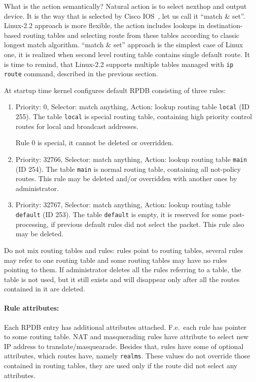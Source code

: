 What is the action semantically? Natural action is to select
nexthop and output device. It is the way that is selected by
Cisco IOS~\cite{IOS}, let us call it ``match \& set''.
Linux-2.2 approach is more flexible, the action includes
lookups in destination-based routing tables and selecting
route from these tables according to classic longest match algorithm.
``match \& set'' approach is the simplest case of Linux one, it is realized
when second level routing table contains single default route.
It is time to remind, that Linux-2.2 supports multiple tables
managed with \verb|ip route| command, described in the previous section.

At startup time kernel configures default RPDB consisting of three
rules:

\begin{enumerate}
\item Priority: 0, Selector: match anything, Action: lookup routing
table \verb|local| (ID 255).
The table \verb|local| is special routing table, containing
high priority control routes for local and broadcast addresses.

Rule 0 is special, it cannot be deleted or overridden.


\item Priority: 32766, Selector: match anything, Action: lookup routing
table \verb|main| (ID 254).
The table \verb|main| is normal routing table, containing all not-policy
routes. This rule may be deleted and/or overridden with another
ones by administrator.

\item Priority: 32767, Selector: match anything, Action: lookup routing
table \verb|default| (ID 253).
The table \verb|default| is empty, it is reserved for some
post-processing, if previous default rules did not select the packet.
This rule also may be deleted.

\end{enumerate}

Do not mix routing tables and rules: rules point to routing tables,
several rules may refer to one routing table and some routing tables
may have no rules pointing to them. If administrator deletes all the rules
referring to a table, the table is not used, but it still exists
and will disappear only after all the routes contained in it are deleted.


\paragraph{Rule attributes:} Each RPDB entry has additional
attributes attached. F.e.\ each rule has pointer to some routing
table. NAT and masquerading rules have attribute to select new IP
address to translate/masquearade. Besides that, rules have some
of optional attributes, which routes have, namely \verb|realms|.
These values do not override those contained in routing tables, they
are used only if the route did not select any attributes.


